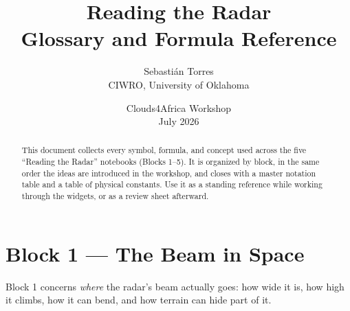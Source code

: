 \documentclass[11pt]{article}
\title{\Huge\bfseries\color{blockblue} Reading the Radar\\[4pt]\Large Glossary and Formula Reference}
\author{Sebasti\'an Torres \\ CIWRO, University of Oklahoma}
\date{Clouds4Africa Workshop \\ July 2026}
\begin{document}
\maketitle
\thispagestyle{empty}

\begin{abstract}
\noindent This document collects every symbol, formula, and concept used across the five ``Reading the Radar'' notebooks (Blocks 1--5). It is organized by block, in the same order the ideas are introduced in the workshop, and closes with a master notation table and a table of physical constants. Use it as a standing reference while working through the widgets, or as a review sheet afterward.
\end{abstract}
\newpage

\tableofcontents
\newpage

\section{Block 1 --- The Beam in Space}

Block 1 concerns \emph{where} the radar's beam actually goes: how wide it is, how high it climbs, how it can bend, and how terrain can hide part of it.
\end{document}
